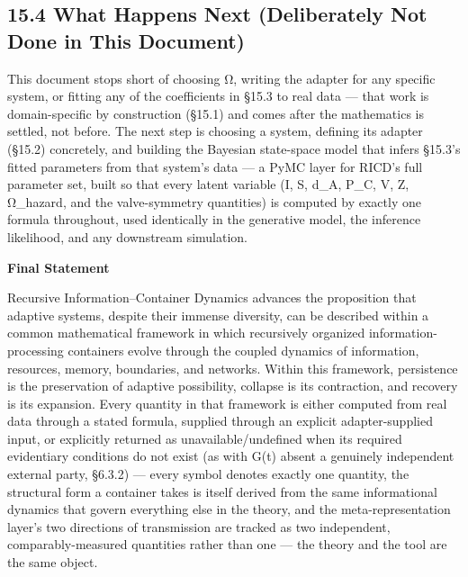 \documentclass[
]{article}
\begin{document}
\hypertarget{what-happens-next-deliberately-not-done-in-this-document}{%
\subsection{15.4 What Happens Next (Deliberately Not Done in This
Document)}\label{what-happens-next-deliberately-not-done-in-this-document}}

This document stops short of choosing Ω, writing the adapter for any
specific system, or fitting any of the coefficients in §15.3 to real
data --- that work is domain-specific by construction (§15.1) and comes
after the mathematics is settled, not before. The next step is choosing
a system, defining its adapter (§15.2) concretely, and building the
Bayesian state-space model that infers §15.3's fitted parameters from
that system's data --- a PyMC layer for RICD's full parameter set, built
so that every latent variable (I, S, d\_A, P\_C, V, Z, Ω\_hazard, and
the valve-symmetry quantities) is computed by exactly one formula
throughout, used identically in the generative model, the inference
likelihood, and any downstream simulation.

\textbf{Final Statement}

Recursive Information--Container Dynamics advances the proposition that
adaptive systems, despite their immense diversity, can be described
within a common mathematical framework in which recursively organized
information-processing containers evolve through the coupled dynamics of
information, resources, memory, boundaries, and networks. Within this
framework, persistence is the preservation of adaptive possibility,
collapse is its contraction, and recovery is its expansion. Every
quantity in that framework is either computed from real data through a
stated formula, supplied through an explicit adapter-supplied input, or
explicitly returned as unavailable/undefined when its required
evidentiary conditions do not exist (as with G(t) absent a genuinely
independent external party, §6.3.2) --- every symbol denotes exactly one
quantity, the structural form a container takes is itself derived from
the same informational dynamics that govern everything else in the
theory, and the meta-representation layer's two directions of
transmission are tracked as two independent, comparably-measured
quantities rather than one --- the theory and the tool are the same
object.
\end{document}

